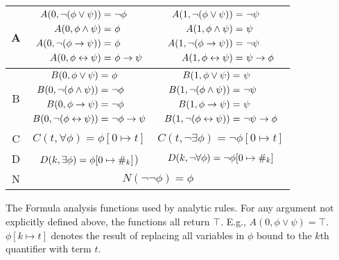 \begin{centering}
    \begin{tabular}{|c|cc|}
    \hline
    A & 
    {
      $\begin{aligned}
        A(0, \lnot (\phi \lor \psi)) =&\ \lnot \phi\\ 
        A(0, \phi \land \psi) =&\ \phi\\ 
        A(0, \lnot (\phi \to \psi)) =&\ \phi\\ 
        A(0, \phi \leftrightarrow \psi) =&\ \phi \to \psi
      \end{aligned}$
    } &  
    {
      $\begin{aligned}
        A(1, \lnot (\phi \lor \psi)) =&\ \lnot \psi\\
        A(1, \phi \land \psi) =&\  \psi\\
        A(1, \lnot (\phi \to \psi)) =&\  \lnot \psi\\
        A(1, \phi \leftrightarrow \psi) =&\  \psi \to \phi
      \end{aligned}$
    } 
    \\ \hline
    B &
    {
      $\begin{aligned}
        B(0, \phi \lor \psi) =&\  \phi\\ 
        B(0, \lnot (\phi \land \psi)) =&\  \lnot \phi\\ 
        B(0, \phi \to \psi) =&\  \lnot \phi\\ 
        B(0, \lnot (\phi \leftrightarrow \psi)) =&\  \lnot \phi \to \psi
      \end{aligned}$
    } &  
    {
      $\begin{aligned}
        B(1, \phi \lor \psi) =&\  \psi\\
        B(1, \lnot (\phi \land \psi)) =&\  \lnot \psi\\
        B(1, \phi \to \psi) =&\  \psi\\
        B(1, \lnot (\phi \leftrightarrow \psi)) =&\  \lnot \psi \to \phi
      \end{aligned}$
    } 
    \\ \hline
    C & 
    $C(t, \forall \phi) = \phi [0 \mapsto t]$ &
    $C(t, \lnot \exists \phi) = \lnot \phi [0 \mapsto t]$
     \\ \hline
    D & 
    $D(k, \exists \phi) = \phi [0 \mapsto \#_{k}]$) &
    $D(k, \lnot \forall \phi) = \lnot \phi [0 \mapsto \#_{k}]$ 
    \\ \hline
    N & \multicolumn{2}{c|}{$N(\lnot \lnot \phi) = \phi$} 
    \\ \hline
  \end{tabular}
  
\end{centering}

\vspace{5mm}

    The Formula analysis functions used by analytic rules. For any argument not explicitly 
    defined above, the functions all return $\top$. E.g., $A(0, \phi \lor \psi) = \top$.
    $\phi[k \mapsto t]$ denotes the result of replacing all variables in $\phi$ bound 
    to the $k$th quantifier with term $t$. 